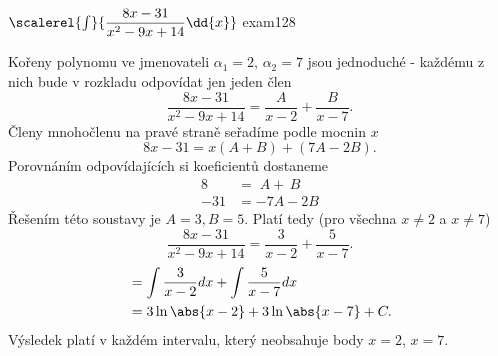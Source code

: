 \begin{mathexam}{\(\protect\scalerel{\int}{\dfrac{8x-31}{x^2-9x+14}\dd{x}}\) \hfill
  \cite[s.~90]{Knichal}}{exam128} 
  
  Kořeny polynomu ve jmenovateli $\alpha_1 = 2$, $\alpha_2 = 7$ jsou jednoduché - každému z nich
  bude v rozkladu odpovídat jen jeden člen $$\frac{8x-31}{x^2-9x+14} = \frac{A}{x-2} +
  \frac{B}{x-7}.$$ Členy mnohočlenu na pravé straně seřadíme podle mocnin \(x\) $$8x-31 =
  x(A+B)+(7A-2B).$$ Porovnáním odpovídajících si koeficientů dostaneme
  \begin{align*}
    8   &=   \; A + \, B \\
    -31 &= -7A - 2B
  \end{align*}
  Řešením této soustavy je $A = 3, B = 5$. Platí tedy (pro všechna $x \neq 2$ a $x \neq 7$)
  $$\frac{8x-31}{x^2-9x+14} = \frac{3}{x-2} + \frac{5}{x-7}.$$
  \begin{align*}
      &= \int{\frac{3}{x-2}}dx + \int{\frac{5}{x-7}}dx      \\
      &= 3\ln\abs{x-2} + 3\ln\abs{x-7} + C.
  \end{align*}
  Výsledek platí v každém intervalu, který neobsahuje body \(x = 2\), \(x = 7\).
\end{mathexam}